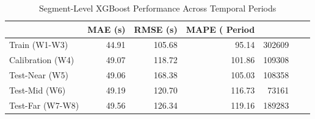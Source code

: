 \begin{table}
\caption{Segment-Level XGBoost Performance Across Temporal Periods}
\label{tab:segment_xgboost_performance}
\begin{tabular}{lrrrr}
\toprule
 & MAE (s) & RMSE (s) & MAPE (%
Period &  &  &  &  \\
\midrule
Train (W1-W3) & 44.91 & 105.68 & 95.14 & 302609 \\
Calibration (W4) & 49.07 & 118.72 & 101.86 & 109308 \\
Test-Near (W5) & 49.06 & 168.38 & 105.03 & 108358 \\
Test-Mid (W6) & 49.19 & 120.70 & 116.73 & 73161 \\
Test-Far (W7-W8) & 49.56 & 126.34 & 119.16 & 189283 \\
\bottomrule
\end{tabular}
\end{table}
